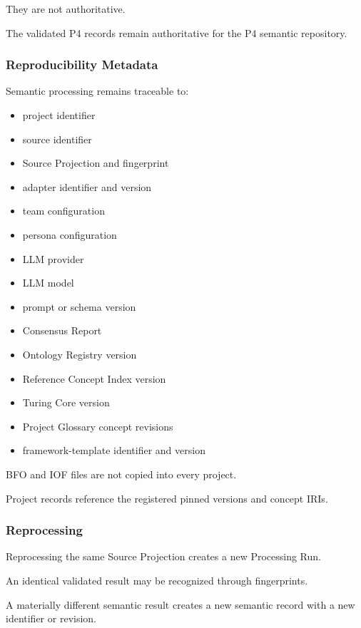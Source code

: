 They are not authoritative.

The validated P4 records remain authoritative for the P4 semantic repository.

\hypertarget{reproducibility-metadata}{%
\subsubsection{Reproducibility Metadata}\label{reproducibility-metadata}}

Semantic processing remains traceable to:

\begin{itemize}
\tightlist
\item
  project identifier
\item
  source identifier
\item
  Source Projection and fingerprint
\item
  adapter identifier and version
\item
  team configuration
\item
  persona configuration
\item
  LLM provider
\item
  LLM model
\item
  prompt or schema version
\item
  Consensus Report
\item
  Ontology Registry version
\item
  Reference Concept Index version
\item
  Turing Core version
\item
  Project Glossary concept revisions
\item
  framework-template identifier and version
\end{itemize}

BFO and IOF files are not copied into every project.

Project records reference the registered pinned versions and concept IRIs.

\hypertarget{reprocessing}{%
\subsubsection{Reprocessing}\label{reprocessing}}

Reprocessing the same Source Projection creates a new Processing Run.

An identical validated result may be recognized through fingerprints.

A materially different semantic result creates a new semantic record with a new identifier or revision.

